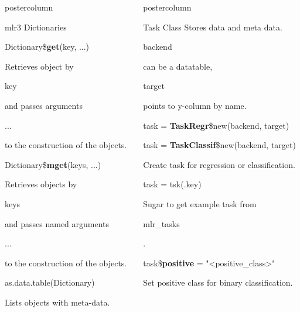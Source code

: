 \documentclass{beamer}
\newlength{\columnheight} %
\newcommand{\codeinline}[1]{\begin{codeboxinline}#1\end{codeboxinline}}
\begin{document}
\begin{frame}[fragile]{}
\begin{columns}
\begin{column}{.245\textwidth}
\begin{beamercolorbox}[center]{postercolumn}
\begin{minipage}{.98\textwidth}
{\begin{myblock}{mlr3 Dictionaries}
							\begin{codebox}
								Dictionary\$\textbf{get}(key, ...)
							\end{codebox}
							Retrieves object by \codeinline{key} and 
							passes arguments \codeinline{...} to the construction of the objects.
							\\
							\begin{codebox}
								Dictionary\$\textbf{mget}(keys, ...)
							\end{codebox}
							Retrieves objects by \codeinline{keys} and 
							passes named arguments \codeinline{...} to the construction of the objects. 
							\\
							\begin{codebox}
								as.data.table(Dictionary)
							\end{codebox}
							Lists objects with meta-data.
						\end{myblock}
					\vfill}
				\end{minipage}
			\end{beamercolorbox}
		\end{column}
		\begin{column}{.245\textwidth}
			\begin{beamercolorbox}[center]{postercolumn}
				\begin{minipage}{.98\textwidth}
					\parbox[t][\columnheight]{\textwidth}{
						\begin{myblock}{Task Class}
							Stores data and meta data. \codeinline{backend} can be a datatable, 
                            \codeinline{target} points to y-column by name.
							\\
							\begin{codebox}
								task = \textbf{TaskRegr}\$new(backend, target) 
							\end{codebox}
							\begin{codebox}
								task = \textbf{TaskClassif}\$new(backend, target) 
							\end{codebox}
                            Create task for regression or classification. 
							\begin{codebox}
                                task = tsk(.key)
							\end{codebox}
                            Sugar to get example task from \codeinline{mlr\_tasks}.
							\begin{codebox}
								task\$\textbf{positive} = "<positive\_class>"
							\end{codebox}
							Set positive class for binary classification.

\end{myblock}}
\end{minipage}
\end{beamercolorbox}
\end{column}
\end{columns}
\end{frame}
\end{document}
